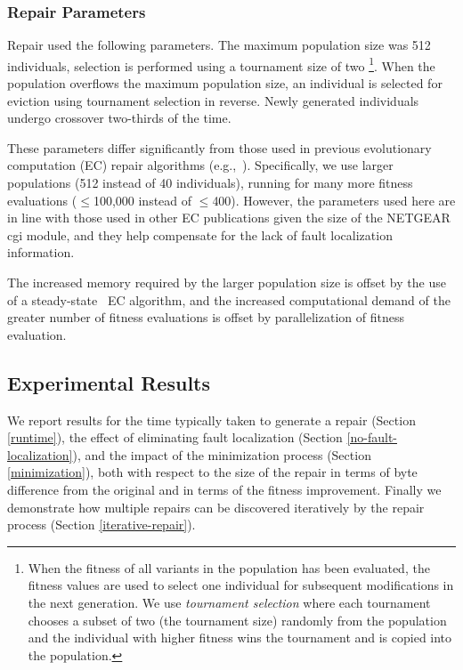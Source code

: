 \documentclass{sigcomm-alternate}
\begin{document}
\subsubsection{Repair Parameters}
\label{sec:parameters}
Repair used the following parameters.  The maximum population size was
512 individuals, selection is performed using a tournament size of two
\footnote{When the fitness of all variants in the population has been
  evaluated, the fitness values are used to select one individual for
  subsequent modifications in the next generation.  We use
  \emph{tournament selection} where each tournament chooses a subset
  of two (the tournament size) randomly from the population and the
  individual with higher fitness wins the tournament and is copied
  into the population.}.  When the population overflows the maximum
population size, an individual is selected for eviction using
tournament selection in reverse.  Newly generated individuals undergo
crossover two-thirds of the time.

These parameters differ significantly from those used in previous
evolutionary computation (EC)
repair algorithms
(e.g.,~\cite{forrest2009genetic,legoues2011systematicstudy,le2012representations}).
Specifically, we use larger populations (512 instead of 40 individuals),
running for many more fitness evaluations ($\leq$100,000 instead of
$\leq$400).  However, the parameters used here are in line with
those used in other EC publications given the size of the NETGEAR cgi
module, and they
help compensate for the lack of fault localization
information.

The increased memory required by the larger population size is offset
by the use of a steady-state~\cite{Luke2013Metaheuristics} EC
algorithm, and the increased computational demand of the greater
number of fitness evaluations is offset by parallelization of fitness
evaluation.

\subsection{Experimental Results}
\label{analysis}

We report results for the time typically taken to generate a repair
(Section \ref{runtime}), the effect of eliminating fault localization
(Section \ref{no-fault-localization}), and the impact of the
minimization process (Section \ref{minimization}), both with respect
to the size of the repair in terms of byte difference from the
original and in terms of the fitness improvement.  Finally we
demonstrate how multiple repairs can be discovered iteratively by the
repair process (Section \ref{iterative-repair}).
\end{document}
